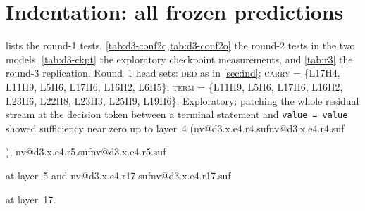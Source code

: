 \documentclass[11pt]{article}
\makeatletter
\newcommand{\nv}[1]{\ifcsname nv@#1\endcsname\csname nv@#1\endcsname\else\PackageError{numbers}{Unknown number key #1}{}\fi}
\newcommand{\hd}[2]{L#1H#2}
\newcommand{\code}[1]{\texttt{#1}}
\newcommand{\ded}{\textsc{ded}}
\newcommand{\term}{\textsc{term}}
\newcommand{\carry}{\textsc{carry}}
\makeatother
\begin{document}



\section{Indentation: all frozen predictions}
\label{app:ind}

 lists the round-1 tests, \cref{tab:d3-conf2q,tab:d3-conf2o} the round-2 tests in the two models, \cref{tab:d3-ckpt} the exploratory checkpoint measurements, and \cref{tab:r3} the round-3 replication. Round~1 head sets: \ded{} as in \cref{sec:ind}; \carry{} = \{\hd{17}{4}, \hd{11}{9}, \hd{5}{6}, \hd{17}{6}, \hd{16}{2}, \hd{6}{5}\}; \term{} = \{\hd{11}{9}, \hd{5}{6}, \hd{17}{6}, \hd{16}{2}, \hd{23}{6}, \hd{22}{8}, \hd{23}{3}, \hd{25}{9}, \hd{19}{6}\}. Exploratory: patching the whole residual stream at the decision token between a terminal statement and \code{value = value} showed sufficiency near zero up to layer~4 (\nv{d3.x.e4.r4.suf}), \nv{d3.x.e4.r5.suf} at layer~5 and \nv{d3.x.e4.r17.suf} at layer~17.





\end{document}
